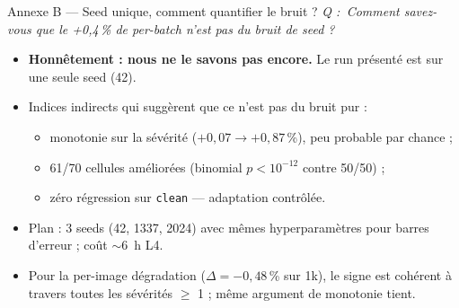 \documentclass[10pt,aspectratio=169]{beamer}
\newcommand{\code}[1]{\texttt{\small #1}}
\newcommand{\qbox}[1]{\textit{\textcolor{accent}{Q : #1}}\par\smallskip}
\begin{document}
\begin{frame}{Annexe B --- Seed unique, comment quantifier le bruit ?}
  \qbox{\guillemotleft\,Comment savez-vous que le +0,4\,\% de per-batch n'est pas du bruit de seed ?\,\guillemotright{}}

  \begin{itemize}
    \item \textbf{Honnêtement : nous ne le savons pas encore.} Le run présenté est sur une seule seed (42).
    \item Indices indirects qui suggèrent que ce n'est pas du bruit pur :
    \begin{itemize}\small
      \item monotonie sur la sévérité ($+0{,}07 \to +0{,}87$\,\%), peu probable par chance ;
      \item 61/70 cellules améliorées (binomial $p \!<\! 10^{-12}$ contre 50/50) ;
      \item zéro régression sur \code{clean} --- adaptation contrôlée.
    \end{itemize}
    \item Plan : 3 seeds (42, 1337, 2024) avec mêmes hyperparamètres pour barres d'erreur ; coût $\sim$6~h L4.
    \item Pour la per-image dégradation ($\Delta = -0{,}48$\,\% sur 1k), le signe est cohérent à travers toutes les sévérités $\geq$ 1 ; même argument de monotonie tient.
  \end{itemize}
\end{frame}
\end{document}
